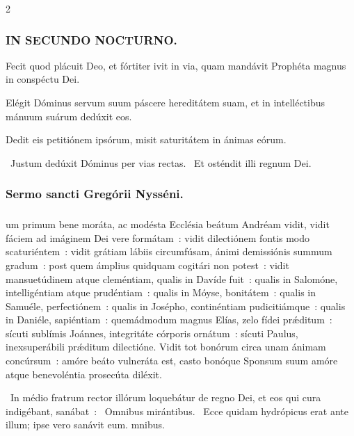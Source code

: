 \documentclass[9pt,twoside]{extarticle}
\begin{document}
\begin{multicols}{2}
{\subsubsection*{\center \textsc{IN SECUNDO NOCTURNO.}}
\begin{tightlist}{}
\item {} Fecit quod plácuit Deo, et fórtiter ivit in via, quam mandávit Prophéta magnus in conspéctu Dei.
\item {} Elégit Dóminus servum suum páscere hereditátem suam, et in intelléctibus mánuum suárum dedúxit eos.
\item {} Dedit eis petitiónem ipsórum, misit saturitátem in ánimas eórum.
\item {}~Justum dedúxit Dóminus per vias rectas. ~Et osténdit illi regnum Dei.
\end{tightlist}

\subsubsection*{\center Sermo sancti Gregórii Nysséni.}
\subsubsection*{\center {}}
um primum bene moráta, ac modésta Ecclésia beátum Andréam vidit, vidit fáciem ad imáginem Dei vere formátam~: vidit dilectiónem fontis modo scaturiéntem~: vidit grátiam lábiis circumfúsam, ánimi demissiónis summum gradum~: post quem ámplius quidquam cogitári non potest~: vidit mansuetúdinem atque cleméntiam, qualis in Davíde fuit~: qualis in Salomóne, intelligéntiam atque prudéntiam~: qualis in Móyse, bonitátem~: qualis in Samuéle, perfectiónem~: qualis in Josépho, continéntiam pudicitiámque~: qualis in Daniéle, sapiéntiam~: quemádmodum magnus Elías, zelo fídei prǽditum~: sícuti sublímis Joánnes, integritáte córporis ornátum~: sícuti Paulus, inexsuperábili prǽditum dilectióne. Vidit tot bonórum circa unam ánimam concúrsum~: amóre beáto vulneráta est, casto bonóque Sponsum suum amóre atque benevoléntia prosecúta diléxit.

\begin{tightlist}{}
\item {}~In médio fratrum rector illórum loquebátur de regno Dei, et eos qui cura indigébant, sanábat~: \textred{*}~Omnibus mirántibus. ~Ecce quidam hydrópicus erat ante illum; ipse vero sanávit eum. mnibus.
\end{tightlist}

}
\end{multicols}
\end{document}
